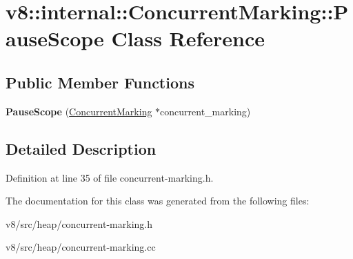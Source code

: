 \hypertarget{classv8_1_1internal_1_1ConcurrentMarking_1_1PauseScope}{}\section{v8\+:\+:internal\+:\+:Concurrent\+Marking\+:\+:Pause\+Scope Class Reference}
\label{classv8_1_1internal_1_1ConcurrentMarking_1_1PauseScope}
\subsection*{Public Member Functions}
\begin{DoxyCompactItemize}
\item 
\mbox{\label{classv8_1_1internal_1_1ConcurrentMarking_1_1PauseScope_a113ad21a5d718010c2d3fe071d1f6bd2}} 
{\bfseries Pause\+Scope} (\mbox{\hyperlink{classv8_1_1internal_1_1ConcurrentMarking}{Concurrent\+Marking}} $\ast$concurrent\+\_\+marking)
\end{DoxyCompactItemize}


\subsection{Detailed Description}


Definition at line 35 of file concurrent-\/marking.\+h.



The documentation for this class was generated from the following files\+:\begin{DoxyCompactItemize}
\item 
v8/src/heap/concurrent-\/marking.\+h\item 
v8/src/heap/concurrent-\/marking.\+cc\end{DoxyCompactItemize}
